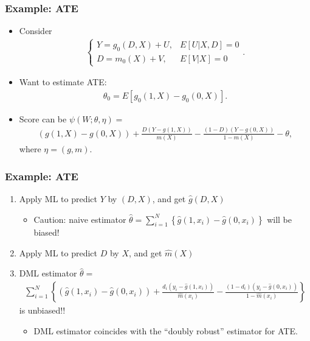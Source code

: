 \documentclass[aspectratio=169, 12pt]{beamer}
\begin{document}
	\begin{frame}
	\frametitle{Example: ATE}
	\begin{itemize}
	\item Consider
	\begin{eqnarray*}
	\begin{cases}
	Y = g_0(D,X) + U, & E[U|X,D]=0\\
	D = m_0(X) + V, & E[V|X]=0
	\end{cases}.
	\end{eqnarray*}
	\item Want to estimate ATE:
	\begin{eqnarray*}
	\theta_0 = E[g_0(1,X)-g_0(0,X)].
	\end{eqnarray*}
	\item Score can be $\psi(W; \theta, \eta) = $
	\begin{eqnarray*}
	(g(1,X)-g(0,X))+\frac{D(Y-g(1,X))}{m(X)}-\frac{(1-D)(Y-g(0,X))}{1-m(X)}-\theta,
	\end{eqnarray*}
	where $\eta = (g,m)$.
	\end{itemize}

	\end{frame}

	\begin{frame}
	\frametitle{Example: ATE}
	\begin{enumerate}
	\item Apply ML to predict $Y$ by $(D,X)$, and get $\hat{g}(D,X) $
	\begin{itemize}
	\item Caution: naive estimator $\hat{\theta} = \sum_{i=1}^N \left\{\hat{g}(1,x_i) - \hat{g}(0,x_i)\right\} $ will be biased!
	\end{itemize}
	\item Apply ML to predict $D$ by $X$, and get $\hat{m}(X) $
	\item DML estimator $\hat{\theta} = $
	\begin{eqnarray*}
	\sum_{i=1}^N \left\{(\hat{g}(1,x_i)-\hat{g}(0,x_i))+\frac{d_i(y_i-\hat{g}(1,x_i))}{\hat{m}(x_i)}-\frac{(1-d_i)(y_i-\hat{g}(0,x_i))}{1-\hat{m}(x_i)} \right\}
	\end{eqnarray*}
	is unbiased!!
	\begin{itemize}
	\item DML estimator coincides with the ``doubly robust'' estimator for ATE.
	\end{itemize}
	\end{enumerate}

	\end{frame}
\end{document}
